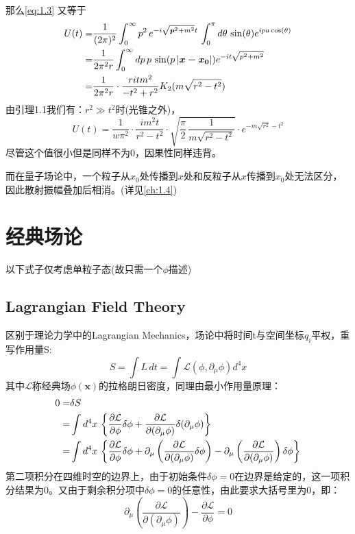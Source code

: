 \documentclass[../main.tex]{subfiles}
\begin{document}
    那么\eqref{eq:1.3} 又等于
    \begin{align}
        U(t) = & \frac{1}{(2\pi)^2} \int_{0}^{\infty} p^2 \, e^{-i\sqrt{\bm{p}^2 + m^2} t} \, \int_{0}^{\pi} d\theta\,\sin(\theta) e^{ipa \cos(\theta)} \notag \\
             = & \frac{1}{2\pi^2r} \int_{0}^{\infty} dp \, p\,\sin(p\left| \bm{x-x_0} \right|) e^{-it\sqrt{p^2+m^2}} \notag \\
             = & \frac{1}{2\pi^2r} \cdot \frac{ritm^2}{-t^2+r^2}K_2(m\sqrt{r^2-t^2})
    \end{align}
    由引理1.1我们有：$r^2 \gg t^2$时(光锥之外)，
    \begin{equation}
        U(t) = \frac{1}{w\pi^2} \cdot \frac{im^2t}{r^2-t^2} \cdot \sqrt{\frac{\pi}{2} \, \frac{1}{m\sqrt{r^2-t^2}}} \cdot e^{-m\sqrt{r^2}-t^2}
    \end{equation}
    尽管这个值很小但是同样不为0，因果性同样违背。

    而在量子场论中，一个粒子从$x_0$处传播到$x$处和反粒子从$x$传播到$x_0$处无法区分，因此散射振幅叠加后相消。(详见\ref{ch:1.4})
\section{经典场论}
以下式子仅考虑单粒子态(故只需一个$\phi$描述)
\subsection{Lagrangian Field Theory}
    区别于理论力学中的Lagrangian Mechanics，场论中将时间t与空间坐标$q_i$平权，重写作用量S:
    \begin{equation}
        S = \int L\,dt = \int \mathcal{L} (\phi,\partial_{\mu}\phi)d^4x
    \end{equation}
    其中$\mathcal{L}$称经典场$\phi(\bm{x})$的拉格朗日密度，同理由最小作用量原理：
   \begin{align}
        0 = & \delta S \notag \\
          = & \int d^4x\,\left\{ \frac{\partial\mathcal{L}}{\partial \phi}\delta \phi + \frac{\partial \mathcal{L}}{\partial(\partial_{\mu}\phi)}\delta(\partial_{\mu}\phi) \right\} \notag \\
          = & \int d^4x\,\left\{ \frac{\partial\mathcal{L}}{\partial \phi}\delta \phi + \partial_{\mu}\left( \frac{\partial\mathcal{L}}{\partial(\partial_{\mu}\phi)}\delta\phi \right) - \partial_{\mu}\left( \frac{\partial\mathcal{L}}{\partial(\partial_{\mu}\phi)} \right)\delta\phi \right\}
    \end{align}
    第二项积分在四维时空的边界上，由于初始条件$\delta\phi = 0$在边界是给定的，这一项积分结果为0。又由于剩余积分项中$\delta\phi = 0$的任意性，由此要求大括号里为0，即：
    \begin{equation}
        \partial_{\mu}\left( \frac{\partial\mathcal{L}}{\partial(\partial_{\mu}\phi)} \right) - \frac{\partial\mathcal{L}}{\partial\phi} = 0
    \end{equation}
\end{document}
